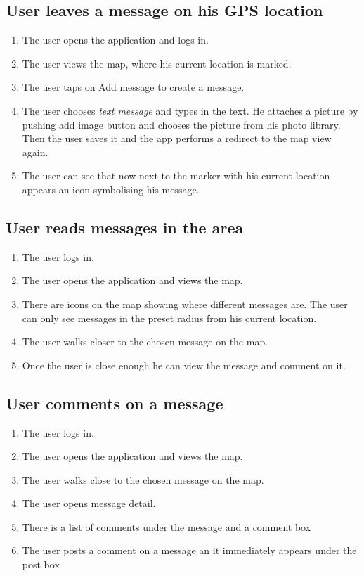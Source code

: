 \documentclass[thesis=M,english]{FITthesis}[2012/10/20]
\begin{document}
\subsection{User leaves a message on his GPS location}
\begin{enumerate}
	\item The user opens the application and logs in.
	\item The user views the map, where his current location is marked.
	\item The user taps on Add message to create a message.
	\item The user chooses \textit{text message} and types in the text. He attaches a picture by pushing add image button and chooses the picture from his photo library. Then the user saves it and the app performs a redirect to the map view again.
	\item The user can see that now next to the marker with his current location appears an icon symbolising his message.
\end{enumerate}

\subsection{User reads messages in the area}
\begin{enumerate}
	\item The user logs in.
	\item The user opens the application and views the map.
	\item There are icons on the map showing where different messages are. The user can only see messages in the preset radius from his current location.
	\item The user walks closer to the chosen message on the map.
	\item Once the user is close enough he can view the message and comment on it.
\end{enumerate}

\subsection{User comments on a message}
\begin{enumerate}
	\item The user logs in.
	\item The user opens the application and views the map.
	\item The user walks close to the chosen message on the map.
	\item The user opens message detail.
	\item There is a list of comments under the message and a comment box
	\item The user posts a comment on a message an it immediately appears under the post box
\end{enumerate}
\end{document}
